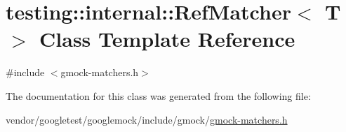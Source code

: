 \hypertarget{classtesting_1_1internal_1_1_ref_matcher}{}\section{testing\+:\+:internal\+:\+:Ref\+Matcher$<$ T $>$ Class Template Reference}
\label{classtesting_1_1internal_1_1_ref_matcher}


{\ttfamily \#include $<$gmock-\/matchers.\+h$>$}



The documentation for this class was generated from the following file\+:\begin{DoxyCompactItemize}
\item 
vendor/googletest/googlemock/include/gmock/\hyperlink{gmock-matchers_8h}{gmock-\/matchers.\+h}\end{DoxyCompactItemize}
